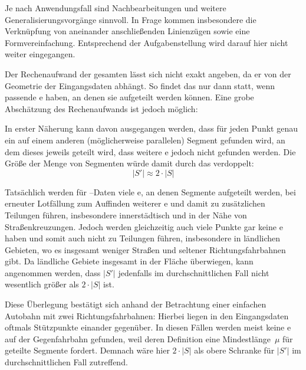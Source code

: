 \documentclass[../main/thesis.tex]{subfiles}
\begin{document}

Je nach Anwendungsfall sind Nachbearbeitungen und weitere Generalisierungsvorgänge sinnvoll.
In Frage kommen insbesondere die Verknüpfung von aneinander anschließenden Linienzügen sowie eine Formvereinfachung.
Entsprechend der Aufgabenstellung wird darauf hier nicht weiter eingegangen.

Der Rechenaufwand der gesamten  lässt sich nicht exakt angeben, da er von der Geometrie der Eingangsdaten abhängt.
So findet das  nur dann statt, wenn  passende e haben, an denen sie aufgeteilt werden können.
Eine grobe Abschätzung des Rechenaufwands ist jedoch möglich:

In erster Näherung kann davon ausgegangen werden, dass für jeden Punkt genau ein  auf einem anderen (möglicherweise parallelen) Segment gefunden wird, an dem dieses jeweils geteilt wird, dass weitere e jedoch nicht gefunden werden.
Die Größe der Menge von Segmenten würde damit durch das  verdoppelt:
\[
|S'| \approx 2 \cdot |S|
\]

Tatsächlich werden für --Daten viele e, an denen Segmente aufgeteilt werden, bei erneuter Lotfällung zum Auffinden weiterer e und damit zu zusätzlichen Teilungen führen, insbesondere innerstädtisch und in der Nähe von Straßenkreuzungen.
Jedoch werden gleichzeitig auch viele Punkte gar keine e haben und somit auch nicht zu Teilungen führen, insbesondere in ländlichen Gebieten, wo es insgesamt weniger Straßen und seltener Richtungsfahrbahnen gibt.
Da ländliche Gebiete insgesamt in der Fläche überwiegen, kann angenommen werden, dass $|S'|$ jedenfalls im durchschnittlichen Fall nicht wesentlich größer als $2 \cdot |S|$ ist.

Diese Überlegung bestätigt sich anhand der Betrachtung einer einfachen Autobahn mit zwei Richtungsfahrbahnen:
Hierbei liegen in den Eingangsdaten oftmals Stützpunkte einander gegenüber.
In diesen Fällen werden meist keine e auf der Gegenfahrbahn gefunden, weil deren Definition eine Mindestlänge~$\mu$ für geteilte Segmente fordert.
Demnach wäre hier $2 \cdot |S|$ als obere Schranke für $|S'|$ im durchschnittlichen Fall zutreffend.
\end{document}
